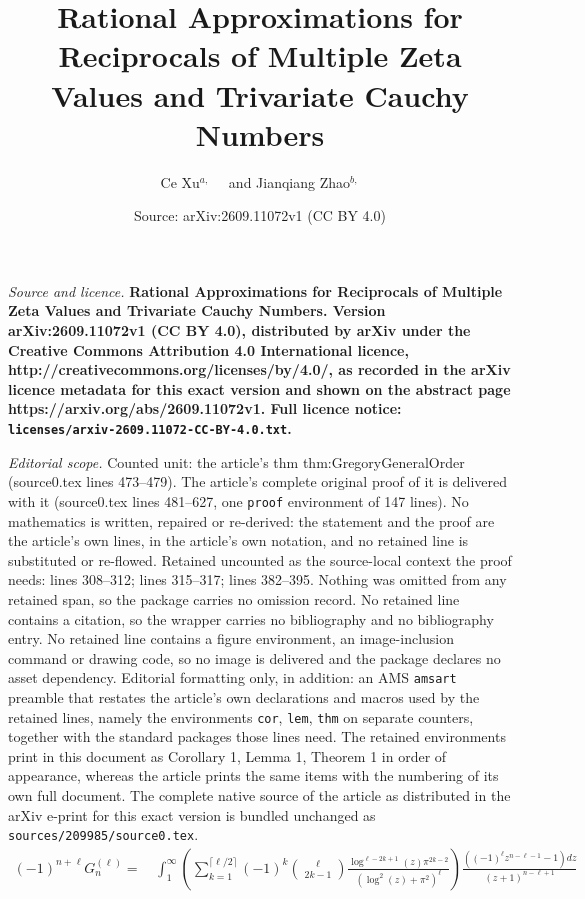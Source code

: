 \documentclass[10pt,a4paper]{amsart}
\title{\bf Rational Approximations for Reciprocals of Multiple Zeta Values and Trivariate Cauchy Numbers}
\author{{Ce Xu${}^{a,}${} \ \ and Jianqiang Zhao${}^{b,}$}}
\date{Source: arXiv:2609.11072v1 (CC BY 4.0)}
\begin{document}
\maketitle

\noindent\emph{Source and licence.} \bf Rational Approximations for Reciprocals of Multiple Zeta Values and Trivariate Cauchy Numbers. Version arXiv:2609.11072v1 (CC BY 4.0), distributed by arXiv under the Creative Commons Attribution 4.0 International licence, http://creativecommons.org/licenses/by/4.0/, as recorded in the arXiv licence metadata for this exact version and shown on the abstract page https://arxiv.org/abs/2609.11072v1. Full licence notice: \texttt{licenses/arxiv-2609.11072-CC-BY-4.0.txt}.\par\smallskip

\noindent\textit{Editorial scope.} Counted unit: the article's thm thm:GregoryGeneralOrder (source0.tex lines 473--479). The article's complete original proof of it is delivered with it (source0.tex lines 481--627, one \texttt{proof} environment of 147 lines). No mathematics is written, repaired or re-derived: the statement and the proof are the article's own lines, in the article's own notation, and no retained line is substituted or re-flowed.  Retained uncounted as the source-local context the proof needs: lines 308--312; lines 315--317; lines 382--395.  Nothing was omitted from any retained span, so the package carries no omission record.  No retained line contains a citation, so the wrapper carries no bibliography and no bibliography entry.  No retained line contains a figure environment, an image-inclusion command or drawing code, so no image is delivered and the package declares no asset dependency.  Editorial formatting only, in addition: an AMS \texttt{amsart} preamble that restates the article's own declarations and macros used by the retained lines, namely the environments \texttt{cor}, \texttt{lem}, \texttt{thm} on separate counters, together with the standard packages those lines need.  The retained environments print in this document as Corollary 1, Lemma 1, Theorem 1 in order of appearance, whereas the article prints the same items with the numbering of its own full document.  The complete native source of the article as distributed in the arXiv e-print for this exact version is bundled unchanged as \texttt{sources/209985/source0.tex}.
\begin{align} \label{equ:GnEllIntegral}
(-1)^{n+\ell}  G_n^{(\ell)}
=&\,     \int_1^\infty   \left( \sum_{k=1}^{\lceil \ell/2\rceil} (-1)^k \binom{\ell}{2k-1}
               \frac{\log^{\ell-2k+1}(z) \pi^{2k-2}}{(\log^2(z)+\pi^2)^\ell}  \right)\frac{((-1)^{\ell} z^{n-\ell-1}-1)dz}{(z+1)^{n-\ell+1}}
\end{align}
\end{document}
